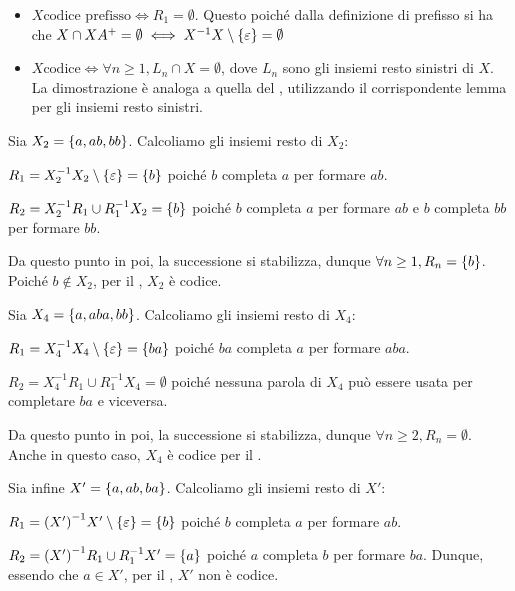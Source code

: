 \begin{observation}{}
  \begin{itemize}
    \item \(X \text{codice prefisso} \iff R_1 = \emptyset\).
      Questo poiché dalla definizione di prefisso si ha che \(X \cap XA^+ = \emptyset \iff X^{-1}X \setminus \set{\varepsilon} = \emptyset\)
    \item \(X \text{codice} \iff \forall n \geq 1, L_n \cap X = \emptyset\),
      dove \(L_n\) sono gli insiemi resto sinistri di \(X\).
      La dimostrazione è analoga a quella del , utilizzando il corrispondente lemma per gli insiemi resto sinistri.
  \end{itemize}
\end{observation}

\begin{example}{}
  Sia \(X_2 = \set{a,ab,bb}\). Calcoliamo gli insiemi resto di \(X_2\):

  \(R_1 = X_2^{-1}X_2 \setminus \set{\varepsilon} = \set{b}\)
  poiché \(b\) completa \(a\) per formare \(ab\).

  \(R_2 = X_2^{-1}R_1 \cup R_1^{-1}X_2 = \set{b}\)
  poiché \(b\) completa \(a\) per formare \(ab\) e \(b\) completa \(bb\) per formare \(bb\).

  Da questo punto in poi, la successione si stabilizza, dunque \(\forall n \geq 1, R_n = \set{b}\).
  Poiché \(b \not\in X_2\), per il , \(X_2\) è codice.

  Sia \(X_4 = \set{a,aba,bb}\). Calcoliamo gli insiemi resto di \(X_4\):
  
  \(R_1 = X_4^{-1}X_4 \setminus \set{\varepsilon} = \set{ba}\)
  poiché \(ba\) completa \(a\) per formare \(aba\).

  \(R_2 = X_4^{-1}R_1 \cup R_1^{-1}X_4 = \emptyset\)
  poiché nessuna parola di \(X_4\) può essere usata per completare \(ba\) e viceversa.
  
  Da questo punto in poi, la successione si stabilizza, dunque \(\forall n \geq 2, R_n = \emptyset\).
  Anche in questo caso, \(X_4\) è codice per il .

  Sia infine \(X' = \set{a,ab,ba}\). Calcoliamo gli insiemi resto di \(X'\):

  \(R_1 = {(X')}^{-1}X' \setminus \set{\varepsilon} = \set{b}\)
  poiché \(b\) completa \(a\) per formare \(ab\).
  
  \(R_2 = {(X')}^{-1}R_1 \cup R_1^{-1}X' = \set{a}\)
  poiché \(a\) completa \(b\) per formare \(ba\).
  Dunque, essendo che \(a \in X'\), per il , \(X'\) non è codice.
\end{example}


